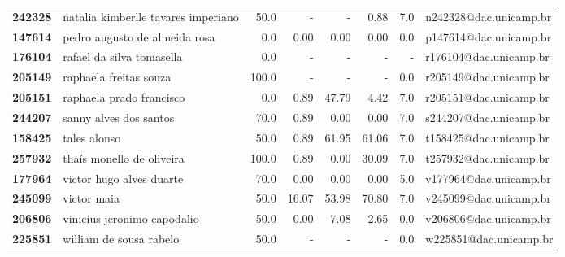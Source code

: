 \documentclass[11pt]{article}
\begin{document}
\begin{center}
\begin{landscape}
\begin{longtable}{llrrrrrl}
\textbf{242328} &    natalia kimberlle tavares imperiano &                  50.0 &           - &           - &        0.88 &                      7.0 &  n242328@dac.unicamp.br \\
\textbf{147614} &          pedro augusto de almeida rosa &                   0.0 &        0.00 &        0.00 &        0.00 &                      0.0 &  p147614@dac.unicamp.br \\
\textbf{176104} &              rafael da silva tomasella &                   0.0 &           - &           - &           - &                        - &  r176104@dac.unicamp.br \\
\textbf{205149} &                 raphaela freitas souza &                 100.0 &           - &           - &           - &                      0.0 &  r205149@dac.unicamp.br \\
\textbf{205151} &               raphaela prado francisco &                   0.0 &        0.89 &       47.79 &        4.42 &                      7.0 &  r205151@dac.unicamp.br \\
\textbf{244207} &                 sanny alves dos santos &                  70.0 &        0.89 &        0.00 &        0.00 &                      7.0 &  s244207@dac.unicamp.br \\
\textbf{158425} &                           tales alonso &                  50.0 &        0.89 &       61.95 &       61.06 &                      7.0 &  t158425@dac.unicamp.br \\
\textbf{257932} &              thaís monello de oliveira &                 100.0 &        0.89 &        0.00 &       30.09 &                      7.0 &  t257932@dac.unicamp.br \\
\textbf{177964} &               victor hugo alves duarte &                  70.0 &        0.00 &        0.00 &        0.00 &                      5.0 &  v177964@dac.unicamp.br \\
\textbf{245099} &                            victor maia &                  50.0 &       16.07 &       53.98 &       70.80 &                      7.0 &  v245099@dac.unicamp.br \\
\textbf{206806} &            vinicius jeronimo capodalio &                  50.0 &        0.00 &        7.08 &        2.65 &                      0.0 &  v206806@dac.unicamp.br \\
\textbf{225851} &                william de sousa rabelo &                  50.0 &           - &           - &           - &                      0.0 &  w225851@dac.unicamp.br \\
\end{longtable}
\end{landscape}\end{center}
\end{document}

